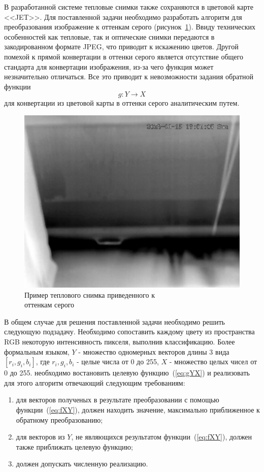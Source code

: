 \documentclass[14pt, a4paper]{extreport}
\begin{document}
	В разработанной системе тепловые снимки также сохраняются в цветовой карте <<JET>>. Для поставленной задачи необходимо разработать алгоритм для преобразования изображение к оттенкам серого (рисунок~\ref{fig:gray_tep_example}). Ввиду технических особенностей как тепловые, так и оптические снимки передаются в закодированном формате JPEG, что приводит к искажению цветов. Другой помехой к прямой конвертации в оттенки серого является отсутствие общего стандарта для конвертации изображения, из-за чего функция может незначительно отличаться. Все это приводит к невозможности задания обратной функции 
	\begin{equation}
		g: Y \rightarrow X
		\label{eq:gYX}
	\end{equation}
	для конвертации из цветовой карты в оттенки серого аналитическим путем. 
	
	\begin{figure}[ht!]
		\centering
		\includegraphics[width = 13cm]{image/chapter_2/gray_tep_example}	
		\caption{Пример теплового снимка приведенного к\\оттенкам серого}
		\label{fig:gray_tep_example}
	\end{figure}

	В общем случае для решения поставленной задачи необходимо решить следующую подзадачу. Необходимо сопоставить каждому цвету из пространства RGB некоторую интенсивность пикселя, выполнив классификацию. Более формальным языком, $Y$ - множество одномерных векторов длины 3 вида $[r_i, g_i, b_i]$, где $r_i, g_i, b_i$ - целые числа от 0 до 255, $X$ - множество целых чисел от 0 до 255. необходимо востановить целевую функцию~(\ref{eq:gYX}) и реализовать для этого алгоритм отвечающий следующим требованиям:
	\begin{enumerate}[label={\arabic*)}]
		\item для векторов полученых в результате преобразовании с помощью функции~(\ref{eq:fXY}), должен находить значение, максимально приближенное к обратному преобразованию;
		\item для векторов из $Y$, не являющихся результатом функции~(\ref{eq:fXY}), должен также приближать целевую функцию;
		\item должен допускать численную реализацию.
	\end{enumerate}
	
\end{document}
